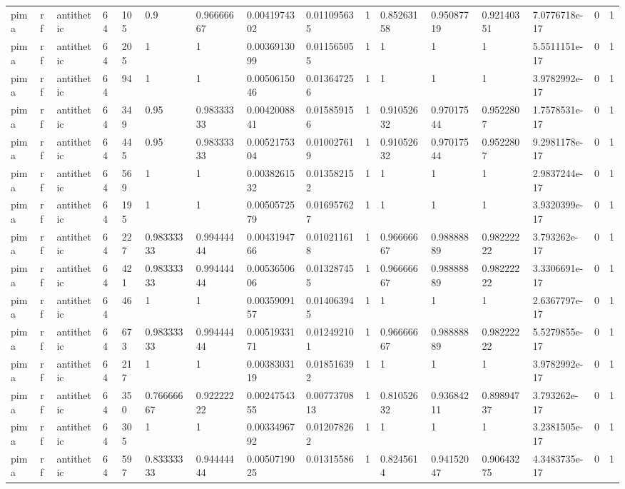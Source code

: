 \begin{tabular}{llllllllllllllll}
pima & rf & antithetic & 64 & 105 & 0.9 & 0.96666667 & 0.0041974302 & 0.011095635 & 1 & 0.85263158 & 0.95087719 & 0.92140351 & 7.0776718e-17 & 0 & 1 \\
pima & rf & antithetic & 64 & 205 & 1 & 1 & 0.0036913099 & 0.011565055 & 1 & 1 & 1 & 1 & 5.5511151e-17 & 0 & 1 \\
pima & rf & antithetic & 64 & 94 & 1 & 1 & 0.0050615046 & 0.013647256 & 1 & 1 & 1 & 1 & 3.9782992e-17 & 0 & 1 \\
pima & rf & antithetic & 64 & 349 & 0.95 & 0.98333333 & 0.0042008841 & 0.015859156 & 1 & 0.91052632 & 0.97017544 & 0.9522807 & 1.7578531e-17 & 0 & 1 \\
pima & rf & antithetic & 64 & 445 & 0.95 & 0.98333333 & 0.0052175304 & 0.010027619 & 1 & 0.91052632 & 0.97017544 & 0.9522807 & 9.2981178e-17 & 0 & 1 \\
pima & rf & antithetic & 64 & 569 & 1 & 1 & 0.0038261532 & 0.013582152 & 1 & 1 & 1 & 1 & 2.9837244e-17 & 0 & 1 \\
pima & rf & antithetic & 64 & 195 & 1 & 1 & 0.0050572579 & 0.016957627 & 1 & 1 & 1 & 1 & 3.9320399e-17 & 0 & 1 \\
pima & rf & antithetic & 64 & 227 & 0.98333333 & 0.99444444 & 0.0043194766 & 0.010211618 & 1 & 0.96666667 & 0.98888889 & 0.98222222 & 3.793262e-17 & 0 & 1 \\
pima & rf & antithetic & 64 & 421 & 0.98333333 & 0.99444444 & 0.0053650606 & 0.013287455 & 1 & 0.96666667 & 0.98888889 & 0.98222222 & 3.3306691e-17 & 0 & 1 \\
pima & rf & antithetic & 64 & 46 & 1 & 1 & 0.0035909157 & 0.014063945 & 1 & 1 & 1 & 1 & 2.6367797e-17 & 0 & 1 \\
pima & rf & antithetic & 64 & 673 & 0.98333333 & 0.99444444 & 0.0051933171 & 0.012492101 & 1 & 0.96666667 & 0.98888889 & 0.98222222 & 5.5279855e-17 & 0 & 1 \\
pima & rf & antithetic & 64 & 217 & 1 & 1 & 0.0038303119 & 0.018516392 & 1 & 1 & 1 & 1 & 3.9782992e-17 & 0 & 1 \\
pima & rf & antithetic & 64 & 350 & 0.76666667 & 0.92222222 & 0.0024754355 & 0.0077370813 & 1 & 0.81052632 & 0.93684211 & 0.89894737 & 3.793262e-17 & 0 & 1 \\
pima & rf & antithetic & 64 & 305 & 1 & 1 & 0.0033496792 & 0.012078262 & 1 & 1 & 1 & 1 & 3.2381505e-17 & 0 & 1 \\
pima & rf & antithetic & 64 & 597 & 0.83333333 & 0.94444444 & 0.0050719025 & 0.01315586 & 1 & 0.8245614 & 0.94152047 & 0.90643275 & 4.3483735e-17 & 0 & 1 \\

\end{tabular}
